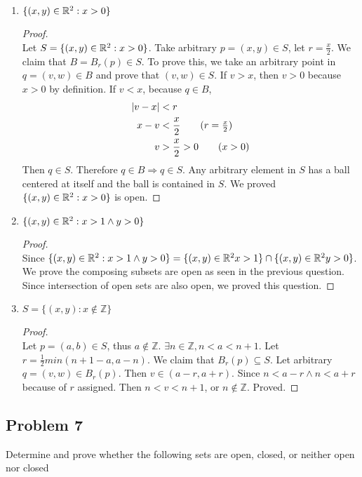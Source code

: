 \documentclass[11pt]{article}
\begin{document}
\begin{enumerate}
  \item $\{(x,y)\in \mathbb{R}^2: x > 0\}$
  \begin{proof}
    $ $\\
    Let $S=\{ (x,y)\in \mathbb{R}^2: x > 0\}$. Take arbitrary $p = (x,y)\in S$, let $r=\frac{x}{2}$. We claim that $B = B_r(p) \in S$. To prove this, we take an arbitrary point in $q = (v, w)\in B$ and prove that $(v, w)\in S$. If $v > x$, then $v>0$ because $x >0$ by definition. If $v < x$, because $q\in B$,
    \begin{align*}
      | v-x | &< r \\
      x - v &< \frac{x}{2} \tag{$r = \frac{x}{2}$}\\
      v &> \frac{x}{2} > 0 \tag{$x>0$}
    \end{align*}
    Then $q\in S$. Therefore $q\in B \Rightarrow q\in S$. Any arbitrary element in $S$ has a ball centered at itself and the ball is contained in $S$. We proved $\{ (x,y)\in \mathbb{R}^2: x > 0\}$ is open.
  \end{proof}

  \item $\{(x,y)\in \mathbb{R}^2: x > 1 \land y>0\}$
  \begin{proof}
    $ $ \\
    Since $\{(x,y)\in \mathbb{R}^2: x > 1 \land y>0\} = \{ (x,y)\in \mathbb{R}^2 x > 1\} \cap \{ (x,y)\in \mathbb{R}^2 y > 0\}$. We prove the composing subsets are open as seen in the previous question. Since intersection of open sets are also open, we proved this question.
  \end{proof}

  \item $S = \{ (x,y): x\not\in \mathbb{Z}\}$
  \begin{proof}
    $ $\\
    Let $p = (a,b)\in S$, thus $a\not\in \mathbb{Z}$. $\exists n \in \mathbb{Z}, n < a < n+1$. Let $r=\frac{1}{2} min(n+1-a, a - n)$. We claim that $B_r(p) \subseteq S$. Let arbitrary $q = (v,w) \in B_r(p)$. Then $v\in (a-r, a+r)$. Since $n < a-r \land n < a+r$ because of $r$ assigned. Then $n< v < n+1$, or $n\not\in \mathbb{Z}$. Proved.
  \end{proof}
\end{enumerate}


\subsection*{Problem 7}
Determine and prove whether the following sets are open, closed, or neither open nor closed
\end{document}

